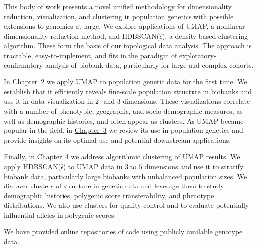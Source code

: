 This body of work presents a novel unified methodology for dimensionality reduction, visualization, and clustering in population genetics with possible extensions to genomics at large. We explore applications of UMAP, a nonlinear dimensionality-reduction method, and HDBSCAN($\hat{\epsilon}$), a density-based clustering algorithm. These form the basis of our topological data analysis. The approach is tractable, easy-to-implement, and fits in the paradigm of exploratory-confirmatory analysis of biobank data, particularly for large and complex cohorts. 

In \hyperref[chap:chapter2]{Chapter~2} we apply UMAP to population genetic data for the first time. We establish that it efficiently reveals fine-scale population structure in biobanks and use it in data visualization in 2- and 3-dimensions. These visualizations correlate with a number of phenotypic, geographic, and socio-demographic measures, as well as demographic histories, and often appear as clusters. As UMAP became popular in the field, in \hyperref[chap:chapter3]{Chapter~3} we review its use in population genetics and provide insights on its optimal use and potential downstream applications.

Finally, in \hyperref[chap:chapter4]{Chapter~4} we address algorithmic clustering of UMAP results. We apply HDBSCAN($\hat{\epsilon}$) to UMAP data in $3$ to $5$ dimensions and use it to stratify biobank data, particularly large biobanks with unbalanced population sizes. We discover clusters of structure in genetic data and leverage them to study demographic histories, polygenic score transferability, and phenotype distributions. We also use clusters for quality control and to evaluate potentially influential alleles in polygenic scores.

We have provided online repositories of code using publicly available genotype data.